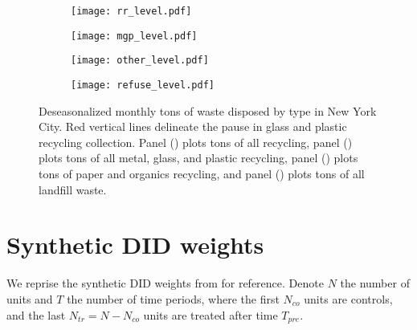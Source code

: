 \documentclass[12pt]{article}
\begin{document}
\begin{figure}[hb]
\centering
\begin{subfigure}[c]{.49\textwidth}
    \centering
    \texttt{[image: rr\_level.pdf]}
            \caption{}\label{fig:rr_level}
    \end{subfigure}
\begin{subfigure}[c]{.49\textwidth}
    \centering
    \texttt{[image: mgp\_level.pdf]}
        \caption{}\label{fig:mgp_level}
\end{subfigure}

\medskip

\begin{subfigure}[c]{.49\textwidth}
    \centering
    \vspace{0pt}
    \texttt{[image: other\_level.pdf]}
        \caption{}\label{fig:other_level}
\end{subfigure}
\begin{subfigure}[c]{.49\textwidth}
    \centering
    \texttt{[image: refuse\_level.pdf]}
        \caption{}\label{fig:refuse_level}
\end{subfigure}
    \caption{Deseasonalized monthly tons of waste disposed by type in New York City.  Red vertical lines delineate the pause in glass and plastic recycling collection.  Panel () plots tons of all recycling, panel () plots tons of all metal, glass, and plastic recycling, panel () plots tons of paper and organics recycling, and panel () plots tons of all landfill waste. } \label{fig:trends_levels}
\end{figure}

\section{Synthetic DID weights} \label{sec:weights}

We reprise the synthetic DID weights from \cite{arkhangelsky2021} for reference.  Denote \(N\) the number of units and \(T\) the number of time periods, where the first \(N_{co}\) units are controls, and the last \(N_{tr}=N-N_{co}\) units are treated after time \(T_{pre}\).
\end{document}
